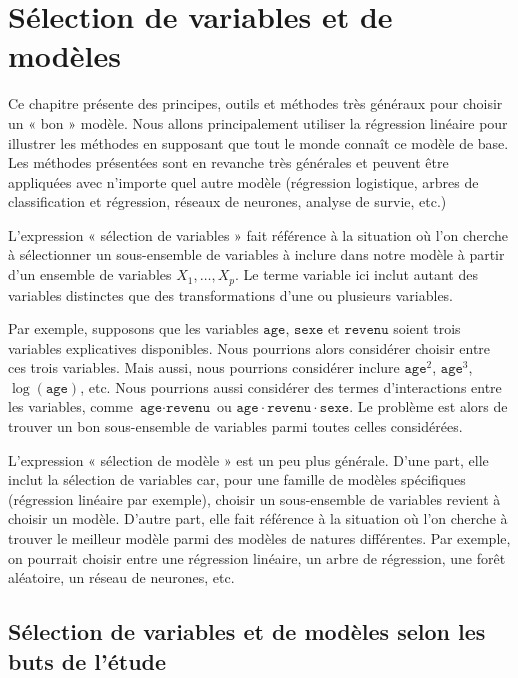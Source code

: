 \documentclass[
  11pt,
  letterpaper,
]{scrbook}
\theoremstyle{definition}
\theoremstyle{remark}
\begin{document}

\chapter{Sélection de variables et de modèles}\label{selection-modele}

Ce chapitre présente des principes, outils et méthodes très généraux
pour choisir un « bon » modèle. Nous allons principalement utiliser la
régression linéaire pour illustrer les méthodes en supposant que tout le
monde connaît ce modèle de base. Les méthodes présentées sont en
revanche très générales et peuvent être appliquées avec n'importe quel
autre modèle (régression logistique, arbres de classification et
régression, réseaux de neurones, analyse de survie, etc.)

L'expression « sélection de variables » fait référence à la situation où
l'on cherche à sélectionner un sous-ensemble de variables à inclure dans
notre modèle à partir d'un ensemble de variables \(X_1, \ldots, X_p\).
Le terme variable ici inclut autant des variables distinctes que des
transformations d'une ou plusieurs variables.

Par exemple, supposons que les variables \(\texttt{age}\),
\(\texttt{sexe}\) et \(\texttt{revenu}\) soient trois variables
explicatives disponibles. Nous pourrions alors considérer choisir entre
ces trois variables. Mais aussi, nous pourrions considérer inclure
\(\texttt{age}^2\), \(\texttt{age}^3\), \(\log(\texttt{age})\), etc.
Nous pourrions aussi considérer des termes d'interactions entre les
variables, comme \(\texttt{age} \cdot \texttt{revenu}\) ou
\(\texttt{age}\cdot\texttt{revenu}\cdot\texttt{sexe}\). Le problème est
alors de trouver un bon sous-ensemble de variables parmi toutes celles
considérées.

L'expression « sélection de modèle » est un peu plus générale. D'une
part, elle inclut la sélection de variables car, pour une famille de
modèles spécifiques (régression linéaire par exemple), choisir un
sous-ensemble de variables revient à choisir un modèle. D'autre part,
elle fait référence à la situation où l'on cherche à trouver le meilleur
modèle parmi des modèles de natures différentes. Par exemple, on
pourrait choisir entre une régression linéaire, un arbre de régression,
une forêt aléatoire, un réseau de neurones, etc.

\section{Sélection de variables et de modèles selon les buts de
l'étude}\label{suxe9lection-de-variables-et-de-moduxe8les-selon-les-buts-de-luxe9tude}
\end{document}
